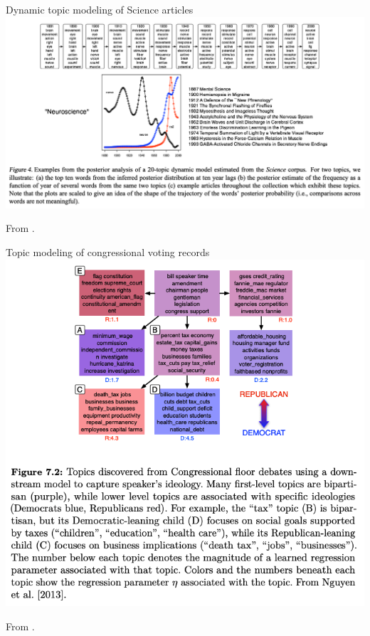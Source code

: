 \documentclass[aspectratio=169]{beamer}
\begin{document}
\begin{frame}{Dynamic topic modeling of Science articles}
\centering
\includegraphics[width=.75\textwidth]{figures/lap5/dtm.png}

From \citet{blei2006dynamic}.
\end{frame}

\begin{frame}{Topic modeling of congressional voting records}
\centering
\includegraphics[width=.5\textwidth]{figures/lap5/taxes.png}

From \citet{Boyd-Graber2017-qk}.
\end{frame}


    
    
    
    
\end{document}
